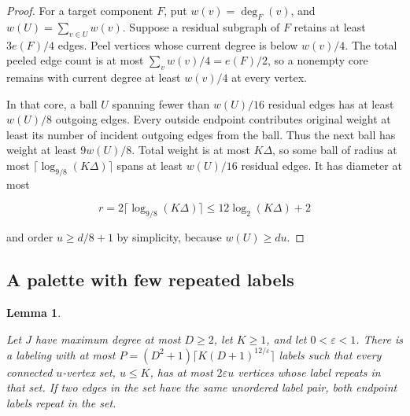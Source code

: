 \documentclass[11pt]{amsart}
\newtheorem{lemma}[theorem]{Lemma}
\theoremstyle{definition}
\theoremstyle{remark}
\numberwithin{equation}{section}
\begin{document}
\begin{proof}

For a target component $F $, put $ w(v)=\deg_F(v)$, and $ w(U)=\sum_{v\in U}w(v)$. Suppose a residual subgraph of $ F $ retains at least $3e(F)/4$ edges. Peel vertices whose current degree is below $ w(v)/4$. The total peeled edge count is at most $\sum_v w(v)/4=e(F)/2$, so a nonempty core remains with current degree at least $ w(v)/4$ at every vertex.

In that core, a ball $U $ spanning fewer than $ w(U)/16$ residual edges has at least $ w(U)/8$ outgoing edges. Every outside endpoint contributes original weight at least its number of incident outgoing edges from the ball. Thus the next ball has weight at least $9w(U)/8$. Total weight is at most $ K\Delta $, so some ball of radius at most $\lceil\log_{9/8}(K\Delta)\rceil $ spans at least $ w(U)/16$ residual edges. It has diameter at most

\begin{equation}
r=2\lceil\log_{9/8}(K\Delta)\rceil\le 12\log_2(K\Delta)+2
\end{equation}

and order $u\ge d/8+1$ by simplicity, because $ w(U)\ge du$.

\end{proof}

\subsection{A palette with few repeated labels}

\begin{lemma}\label{lem:collision-palette}

Let $J $ have maximum degree at most $ D\ge2$, let $ K\ge1$, and let $0<\varepsilon<1$. There is a labeling with at most $ P=(D^2+1)\lceil K(D+1)^{12/\varepsilon}\rceil $ labels such that every connected $ u $-vertex set, $ u\le K $, has at most $2\varepsilon u$ vertices whose label repeats in that set. If two edges in the set have the same unordered label pair, both endpoint labels repeat in the set.

\end{lemma}
\end{document}
